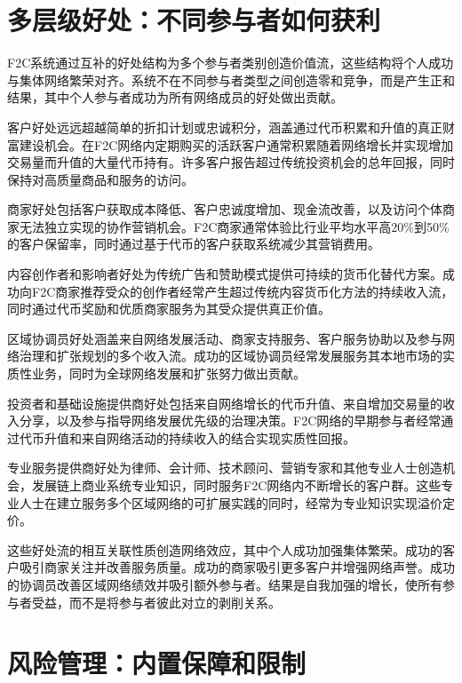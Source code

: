 \documentclass[
  Letterpaper,
]{scrbook}
\begin{document}
\section{多层级好处：不同参与者如何获利}\label{ux591aux5c42ux7ea7ux597dux5904ux4e0dux540cux53c2ux4e0eux8005ux5982ux4f55ux83b7ux5229}

F2C系统通过互补的好处结构为多个参与者类别创造价值流，这些结构将个人成功与集体网络繁荣对齐。系统不在不同参与者类型之间创造零和竞争，而是产生正和结果，其中个人参与者成功为所有网络成员的好处做出贡献。

客户好处远远超越简单的折扣计划或忠诚积分，涵盖通过代币积累和升值的真正财富建设机会。在F2C网络内定期购买的活跃客户通常积累随着网络增长并实现增加交易量而升值的大量代币持有。许多客户报告超过传统投资机会的总年回报，同时保持对高质量商品和服务的访问。

商家好处包括客户获取成本降低、客户忠诚度增加、现金流改善，以及访问个体商家无法独立实现的协作营销机会。F2C商家通常体验比行业平均水平高20\%到50\%的客户保留率，同时通过基于代币的客户获取系统减少其营销费用。

内容创作者和影响者好处为传统广告和赞助模式提供可持续的货币化替代方案。成功向F2C商家推荐受众的创作者经常产生超过传统内容货币化方法的持续收入流，同时通过代币奖励和优质商家服务为其受众提供真正价值。

区域协调员好处涵盖来自网络发展活动、商家支持服务、客户服务协助以及参与网络治理和扩张规划的多个收入流。成功的区域协调员经常发展服务其本地市场的实质性业务，同时为全球网络发展和扩张努力做出贡献。

投资者和基础设施提供商好处包括来自网络增长的代币升值、来自增加交易量的收入分享，以及参与指导网络发展优先级的治理决策。F2C网络的早期参与者经常通过代币升值和来自网络活动的持续收入的结合实现实质性回报。

专业服务提供商好处为律师、会计师、技术顾问、营销专家和其他专业人士创造机会，发展链上商业系统专业知识，同时服务F2C网络内不断增长的客户群。这些专业人士在建立服务多个区域网络的可扩展实践的同时，经常为专业知识实现溢价定价。

这些好处流的相互关联性质创造网络效应，其中个人成功加强集体繁荣。成功的客户吸引商家关注并改善服务质量。成功的商家吸引更多客户并增强网络声誉。成功的协调员改善区域网络绩效并吸引额外参与者。结果是自我加强的增长，使所有参与者受益，而不是将参与者彼此对立的剥削关系。

\section{风险管理：内置保障和限制}\label{ux98ceux9669ux7ba1ux7406ux5185ux7f6eux4fddux969cux548cux9650ux5236}
\end{document}
